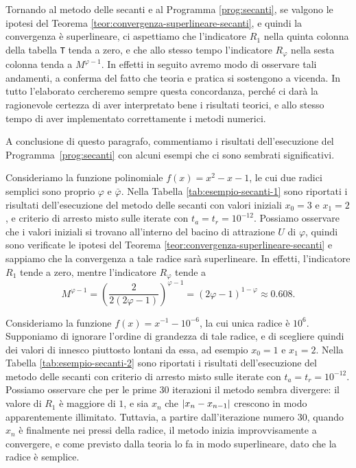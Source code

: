 Tornando al metodo delle secanti e al Programma \ref{prog:secanti},
se valgono le ipotesi del Teorema \ref{teor:convergenza-superlineare-secanti},
e quindi la convergenza è superlineare, ci aspettiamo che l'indicatore $R_1$
nella quinta colonna della tabella \texttt{T} tenda a zero, e che allo stesso
tempo l'indicatore $R_\varphi$ nella sesta colonna tenda a $M^{\varphi-1}$.
In effetti in seguito avremo modo di osservare tali andamenti,
a conferma del fatto che teoria e pratica si sostengono a vicenda.
In tutto l'elaborato cercheremo sempre questa concordanza, perché ci darà
la ragionevole certezza di aver interpretato bene i risultati teorici,
e allo stesso tempo di aver implementato correttamente i metodi numerici.

A conclusione di questo paragrafo, commentiamo i risultati dell'esecuzione
del Programma~\ref{prog:secanti} con alcuni esempi che ci sono sembrati significativi.

\begin{esem}
Consideriamo la funzione polinomiale $f(x) = x^2-x-1$,
le cui due radici semplici sono proprio $\varphi$ e $\bar{\varphi}$.
Nella Tabella \ref{tab:esempio-secanti-1} sono riportati i risultati dell'esecuzione
del metodo delle secanti con valori iniziali $x_0 = 3$ e $x_1 = 2$,
e criterio di arresto misto sulle iterate con $t_a = t_r = 10^{-12}$.
Possiamo osservare che i valori iniziali si trovano all'interno
del bacino di attrazione $U$ di $\varphi$, quindi sono verificate
le ipotesi del Teorema \ref{teor:convergenza-superlineare-secanti}
e sappiamo che la convergenza a tale radice sarà superlineare.
In effetti, l'indicatore $R_1$ tende a zero, mentre l'indicatore
$R_\varphi$ tende a
\[
M^{\varphi-1}
= \left( \frac{2}{2(2\varphi-1)} \right)^{\varphi-1}
= (2\varphi-1)^{1-\varphi}
\approx 0.608.
\]
\end{esem}

\begin{esem}
Consideriamo la funzione $f(x) = x^{-1} - 10^{-6}$, la cui unica radice è $10^6$.
Supponiamo di ignorare l'ordine di grandezza di tale radice,
e di scegliere quindi dei valori di innesco piuttosto lontani da essa,
ad esempio $x_0 = 1$ e $x_1 = 2$.
Nella Tabella \ref{tab:esempio-secanti-2} sono riportati i risultati dell'esecuzione
del metodo delle secanti con criterio di arresto misto sulle iterate
con $t_a = t_r = 10^{-12}$.
Possiamo osservare che per le prime 30 iterazioni il metodo sembra divergere:
il valore di $R_1$ è maggiore di $1$, e sia $x_n$ che $\left\lvert x_n-x_{n-1}\right\rvert$
crescono in modo apparentemente illimitato.
Tuttavia, a partire dall'iterazione numero 30,
quando $x_n$ è finalmente nei pressi della radice,
il metodo inizia improvvisamente a convergere,
e come previsto dalla teoria lo fa in modo superlineare,
dato che la radice è semplice.
\end{esem}

